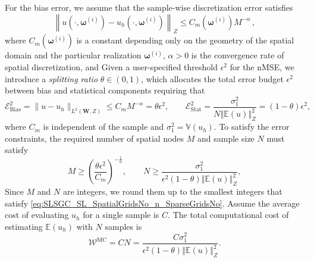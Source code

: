 %
For the bias error, we assume that the sample-wise discretization error satisfies
%
\begin{equation*} \label{eq:Assumption_uhA}
\left\|u\left(\cdot, \boldsymbol\omega^{(i)}\right)-u_h\left(\cdot,\boldsymbol\omega^{(i)}\right)\right\|_Z\leq C_m\left(\boldsymbol\omega^{(i)}\right)M^{-\alpha}\,,
\end{equation*}
%
where $C_m(\boldsymbol\omega^{(i)})$ is a constant depending only on the geometry of the spatial domain and the particular realization $\boldsymbol\omega^{(i)}$, $\alpha>0$ is the convergence rate of spatial discretization, and  Given a user-specified threshold $\epsilon^2$  for the nMSE, we introduce a {\it splitting ratio} $\theta \in (0,1)$, which allocates the total error budget $\epsilon^2$ between bias and statistical components requiring that
%
\begin{equation} \label{eq:error-budget}
\mathcal{E}_{\text{Bias}}^2=\|u-u_h\|_{L^2(\boldsymbol W,Z)}\le C_mM^{-\alpha}= \theta\epsilon^2, \quad\quad \mathcal{E}_{\text{Stat}}^2 = \frac{\sigma_1^2}{N\left\Vert\mathbb{E}(u) \right\Vert_{Z}^2}=(1-\theta)\epsilon^2,
\end{equation}
where $C_m$ is independent of the sample and $\sigma_1^2 = \mathbb{V}\left( u_{h}\right)$. To satisfy the error constraints,  the required number of spatial nodes $M$ and sample size $N$ must satisfy
%
\begin{equation}
\label{eq:SLSGC_SL_SpatialGridsNo_n_SparseGridsNo}
M\ge \left(\frac{\theta\epsilon^2}{C_m}\right)^{-\frac 1 {\alpha}},\quad\quad  N \ge  \frac{\sigma_1^2}{\epsilon^2(1-\theta)\left\Vert\mathbb{E}(u) \right\Vert_{Z}^2},
\end{equation}
%
Since $M$ and $N$ are integers, we round them up to the smallest integers that satisfy \eqref{eq:SLSGC_SL_SpatialGridsNo_n_SparseGridsNo}. Assume the average cost of evaluating $u_{h}$ for a single sample is $C$. The total computational cost of estimating $\mathbb{E}\left(u_h\right)$ with $N$ samples is
%
\[
\mathcal{W}^\text{MC}  = CN=\frac{C\sigma_1^2}{\epsilon^2(1-\theta)\left\Vert\mathbb{E}(u) \right\Vert_{Z}^2}.
\]
%